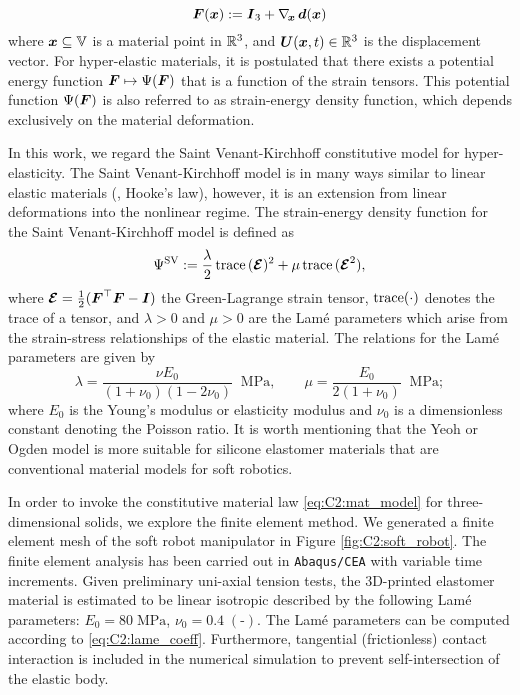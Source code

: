 \begin{equation}
\boldsymbol{F}({\boldsymbol{x}}) := \boldsymbol{I}_3 +
\nabla_{\!{\boldsymbol{x}}}\,\boldsymbol{d}({\boldsymbol{x}})
\end{equation}
%
where ${\boldsymbol{x}} \subseteq \mathbb{V}$ is a material point in $\mathbb{R}^3$, and $\boldsymbol{U}({\boldsymbol{x}},t) \in \mathbb{R}^3$ is the displacement vector. For hyper-elastic materials, it is postulated that there exists a potential energy function $\boldsymbol{F} \mapsto \Psi(\boldsymbol{F})$ that is a function of the strain tensors. This potential function $\Psi(\boldsymbol{F})$ is also referred to as strain-energy density function, which depends exclusively on the material deformation.

In this work, we regard the Saint Venant-Kirchhoff constitutive model for hyper-elasticity. The Saint Venant-Kirchhoff model is in many ways similar to linear elastic materials (\ie, Hooke's law), however, it is an extension from linear deformations into the nonlinear regime. The strain-energy density function for the Saint Venant-Kirchhoff model is defined as
%
\begin{equation}
\Psi^{\textrm{SV}} := \frac{\lambda}{2}\,\text{trace}\,(\boldsymbol{\mathcal{E}})^2 + \mu\,\text{trace}\,(\boldsymbol{\mathcal{E}}^2),
\label{eq:C2:mat_model}
\end{equation}
%
\noindent where $\boldsymbol{\mathcal{E}} = \frac{1}{2}(\boldsymbol{F}^\top\boldsymbol{F} - \boldsymbol{I})$ the Green-Lagrange strain tensor, $\text{trace}(\cdot)$ denotes the trace of a tensor, and $\lambda > 0$ and $\mu > 0$ are the Lam\'{e} parameters which arise from the strain-stress relationships of the elastic material. The relations for the Lam\'{e} parameters are given by
\begin{equation}
%
\lambda = \frac{\nu E_0}{(1+\nu_0)(1-2\nu_0)} \;\; \si{\mega \pascal}, \quad \quad \mu = \frac{E_0}{2(1+\nu_0)} \;\; \si{\mega \pascal};
\label{eq:C2:lame_coeff}
\end{equation}
%
where $E_0$ is the Young's modulus or elasticity modulus and $\nu_0$ is a dimensionless constant denoting the Poisson ratio. It is worth mentioning that the Yeoh or Ogden model is more suitable for silicone elastomer materials that are conventional material models for soft robotics.

In order to invoke the constitutive material law \eqref{eq:C2:mat_model} for three-dimensional solids, we explore the finite element method. We generated a finite element mesh of the soft robot manipulator in Figure \ref{fig:C2:soft_robot}. The finite element analysis has been carried out in \texttt{Abaqus/CEA} with variable time increments. Given preliminary uni-axial tension tests, the 3D-printed elastomer material is estimated to be linear isotropic described by the following Lam\'{e} parameters: $E_0  = 80 \; \si{\mega \pascal}$, $\nu_0 = 0.4 \; (\text{-})$. The Lam\'{e} parameters can be computed according to \eqref{eq:C2:lame_coeff}. Furthermore, tangential (frictionless) contact interaction is included in the numerical simulation to prevent self-intersection of the elastic body.


